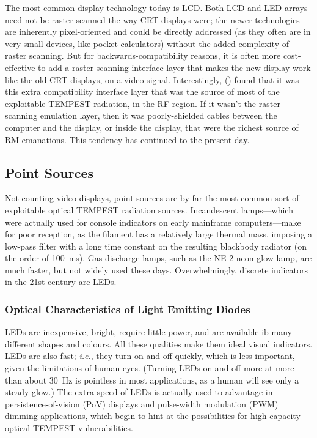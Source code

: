 \documentclass[a4paper,twoside,11pt,openany]{book}
\begin{document}
The most common display technology today is LCD. Both LCD and LED arrays need
not be raster-scanned the way CRT displays were; the newer technologies are
inherently pixel-oriented and could be directly addressed (as they often are in
very small devices, like pocket calculators) without the added complexity of
raster scanning. But for backwards-compatibility reasons, it is often more
cost-effective to add a raster-scanning interface layer that makes the new
display work like the old CRT displays, on a video signal. Interestingly,
\citeauthor{Kuhn2002} (\citeyear{Kuhn2002}) found that it was this extra
compatibility interface layer that was the source of most of the exploitable
TEMPEST radiation, in the RF region. If it wasn't the raster-scanning emulation
layer, then it was poorly-shielded cables between the computer and the display,
or inside the display, that were the richest source of RM emanations. This
tendency has continued to the present day.

\subsection{Point Sources}\label{section:incandescent}

Not counting video displays, point sources are by far the most common sort of
exploitable optical TEMPEST radiation sources. Incandescent lamps---which were
actually used for console indicators on early mainframe computers---make for
poor reception, as the filament has a relatively large thermal mass, imposing a
low-pass filter with a long time constant on the resulting blackbody radiator
(on the order of \SI{100}{\milli\second}). Gas discharge lamps, such as the
NE-2 neon glow lamp, are much faster, but not widely used these days.
Overwhelmingly, discrete indicators in the 21st century are LEDs.

\subsubsection{Optical Characteristics of Light Emitting Diodes}

LEDs are inexpensive, bright, require little power, and are available ib many
different shapes and colours. All these qualities make them ideal visual
indicators. LEDs are also fast; {\it i.e.}, they turn on and off quickly, which
is less important, given the limitations of human eyes. (Turning LEDs on and
off more at more than about \SI{30}{\hertz} is pointless in most applications,
as a human will see only a steady glow.) The extra speed of LEDs is actually
used to advantage in persistence-of-vision (PoV) displays and pulse-width
modulation (PWM) dimming applications, which begin to hint at the possibilities
for high-capacity optical TEMPEST vulnerabilities.
\end{document}
